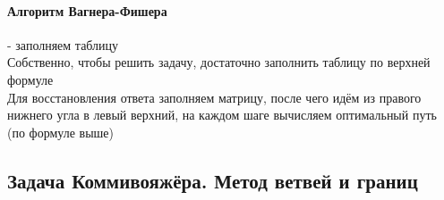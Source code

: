 \documentclass[a4paper,10pt]{article}
\begin{document}
\paragraph{Алгоритм Вагнера-Фишера} - заполняем таблицу\\
Собственно, чтобы решить задачу, достаточно заполнить таблицу по верхней формуле \\
Для восстановления ответа заполняем матрицу, после чего идём из правого нижнего угла в левый верхний, на каждом шаге вычисляем оптимальный путь (по формуле выше) \\
\subsection{Задача Коммивояжёра. Метод ветвей и границ} 
\end{document}
